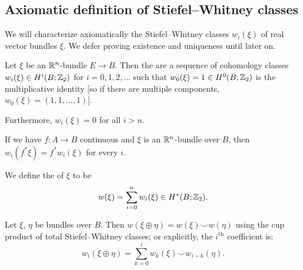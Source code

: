 
\lecture{}


\subsection{Axiomatic definition of Stiefel--Whitney classes}

We will characterize axiomatically the Stiefel--Whitney classes
$w_{i}(\xi)$ of real vector bundles $\xi$.
We defer proving existence and uniqueness until later on.

\begin{axiom}\label{axiom1}
Let $\xi$ be an $\mathbb{R}^{n}$-bundle $E\to B$. Then the
 are a sequence of cohomology classes
$w_{i}(\xi)\in H^{i}(B;\mathbb{Z}_{2})$ for $i=0,1,2,\dots$ such that
$w_{0}(\xi)=1\in H^{0}(B;\mathbb{Z}_{2})$ is the multiplicative identity [so
  if there are multiple components, $w_{0}(\xi)=(1,1,\dots,1)$].

Furthermore, $w_{i}(\xi)=0$ for all $i>n$.
\end{axiom}

\begin{axiom}\label{axiom2}
If we have $f\colon A\to B$ continuous and $\xi$ is an
$\mathbb{R}^{n}$-bundle over $B$, then $w_{i}(f^{*}\xi)=f^{*}w_{i}(\xi)$ for
every $i$.
\end{axiom}

\begin{definition}
We define the  of $\xi$ to be
\begin{equation*}
w(\xi)=\sum^{n}_{i=0}w_{i}(\xi)\in H^{*}(B;\mathbb{Z}_{2}).
\end{equation*}
\end{definition}

\begin{axiom}\label{axiom3}
Let $\xi$, $\eta$ be bundles over $B$. Then
$w(\xi\oplus\eta)=w(\xi)\smile w(\eta)$ using the cup product of total
Stiefel--Whitney classes; or explicitly, the $i^{\text{th}}$
coefficient is:
\begin{equation*}
w_{i}(\xi\oplus\eta)=\sum^{i}_{k=0}w_{k}(\xi)\smile w_{i-k}(\eta).
\end{equation*}
\end{axiom}

